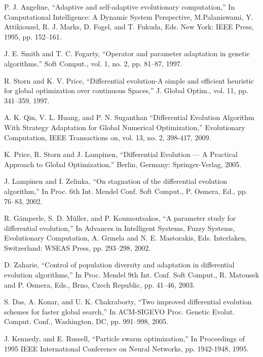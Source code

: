 \documentclass[12pt,a4paper]{article}
\theoremstyle{definition}
\theoremstyle{theorem}
\theoremstyle{definition}
\begin{document}
\small
\begin{thebibliography}{99}

\begin{LTRitems}

\resetlatinfont

P. J. Angeline, “Adaptive and self-adaptive evolutionary computation,” In Computational Intelligence: A Dynamic System Perspective, M.Palaniswami, Y. Attikiouzel, R. J. Marks, D. Fogel, and T. Fukuda, Eds. New York: IEEE Press, 1995, pp. 152–161.

J. E. Smith and T. C. Fogarty, “Operator and parameter adaptation in genetic algorithms,” Soft Comput., vol. 1, no. 2, pp. 81–87, 1997.

R. Storn and K. V. Price, “Differential evolution-A simple and efficient heuristic for global optimization over continuous Spaces,” J. Global Optim., vol. 11, pp. 341–359, 1997.

A. K. Qin, V. L. Huang, and P. N. Suganthan “Differential Evolution Algorithm With Strategy
Adaptation for Global Numerical Optimization,” Evolutionary Computation, IEEE Transactions on, vol. 13, no. 2, 398-417, 2009.

K. Price, R. Storn and J. Lampinen, “Differential Evolution — A Practical Approach to Global Optimization,” Berlin, Germany: Springer-Verlag, 2005.

J. Lampinen and I. Zelinka, “On stagnation of the differential evolution algorithm,” In Proc. 6th Int. Mendel Conf. Soft Comput., P. Osmera, Ed., pp. 76–83, 2002.

R. Gämperle, S. D. Müller, and P. Koumoutsakos, “A parameter study for differential evolution,” In Advances in Intelligent Systems, Fuzzy Systems, Evolutionary Computation, A. Grmela and N. E. Mastorakis, Eds. Interlaken, Switzerland: WSEAS Press, pp. 293–298, 2002.

D. Zaharie, “Control of population diversity and adaptation in differential evolution algorithms,” In Proc. Mendel 9th Int. Conf. Soft Comput., R. Matousek and P. Osmera, Eds., Brno, Czech Republic, pp. 41–46, 2003.

S. Das, A. Konar, and U. K. Chakraborty, “Two improved differential evolution schemes for faster global search,” In ACM-SIGEVO Proc. Genetic Evolut. Comput. Conf., Washington, DC, pp. 991–998, 2005.

J. Kennedy, and E. Russell, “Particle swarm optimization,” In Proceedings of 1995 IEEE International Conference on Neural Networks, pp. 1942-1948, 1995.


\end{LTRitems}
\end{thebibliography}
\end{document}
